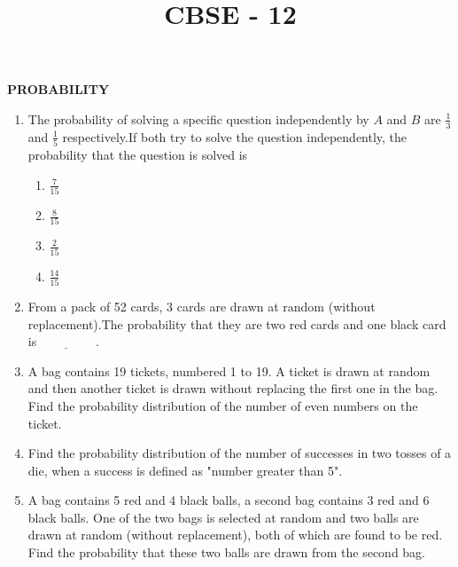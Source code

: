 \documentclass{article}
\begin{document}
\begin{center}
\title{CBSE - 12}
\date{}
\maketitle
\begin{center}
 \textbf{PROBABILITY}
\end{center}

\end{center}
\begin{enumerate}
    \item The probability of solving a specific question independently by $A$ and $B$ are $\frac{1}{3}$ and $\frac{1}{5}$ respectively.If both try to solve the question independently, the probability that the question is solved is
    \begin{enumerate}
        \item $\frac{7}{15}$
        \item $\frac{8}{15}$
        \item $\frac{2}{15}$
        \item $\frac{14}{15}$
    \end{enumerate}
   
    \item From a pack of 52 cards, 3 cards are drawn at random (without replacement).The probability that they are two red cards and one black card is$\underline{\hspace{2cm}}$.
    \item A bag contains 19 tickets, numbered 1 to 19. A ticket is drawn at random and then another ticket is drawn without replacing the first one in the bag. Find the probability distribution of the number of even numbers on the ticket.
   
    \item Find the probability distribution of the number of successes in two tosses of a die, when a success is defined as "number greater than 5".
    \item A bag contains 5 red and 4 black balls, a second bag contains 3 red and 6 black balls. One of the two bags is selected at random and two balls are drawn at random (without replacement), both of which are found to be red. Find the probability that these two balls are drawn from the second bag.
   

\end{enumerate}
\end{document}
